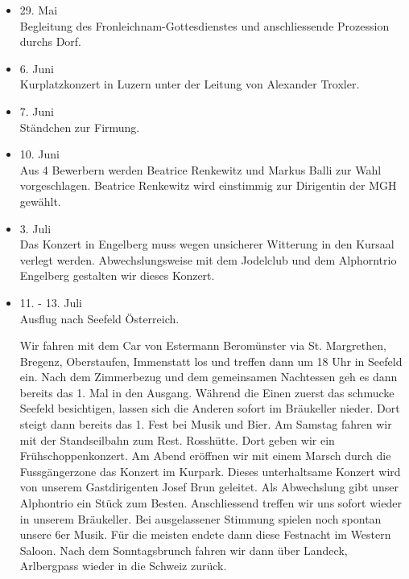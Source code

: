 \begin{history}
\begin{itemize}
        \item[]29. Mai\\
        Begleitung des Fronleichnam-Gottesdienstes und anschliessende Prozession
        durchs Dorf.

        \item[]6. Juni\\
        Kurplatzkonzert in Luzern unter der Leitung von Alexander Troxler.

        \item[]7. Juni\\
        Ständchen zur Firmung.

        \item[]10. Juni\\
        Aus 4 Bewerbern werden Beatrice Renkewitz und Markus Balli zur Wahl
        vorgeschlagen. Beatrice Renkewitz wird einstimmig zur Dirigentin der MGH
        gewählt.

        \item[]3. Juli\\
        Das Konzert in Engelberg muss wegen unsicherer Witterung in den Kursaal
        verlegt werden. Abwechslungsweise mit dem Jodelclub und dem Alphorntrio
        Engelberg gestalten wir dieses Konzert.

        \item[]11. - 13. Juli\\
        Ausflug nach Seefeld Österreich.

        Wir fahren mit dem Car von Estermann
        Beromünster via St. Margrethen, Bregenz, Oberstaufen, Immenstatt los und
        treffen dann um 18 Uhr in Seefeld ein. Nach dem Zimmerbezug und dem
        gemeinsamen Nachtessen geh es dann bereits das 1. Mal in den Ausgang.
        Während die Einen zuerst das schmucke Seefeld besichtigen, lassen sich
        die Anderen sofort im Bräukeller nieder. Dort steigt dann bereits das 1.
        Fest bei Musik und Bier. Am Samstag fahren wir mit der Standseilbahn zum
        Rest. Rosshütte. Dort geben wir ein Frühschoppenkonzert. Am Abend
        eröffnen wir mit einem Marsch durch die Fussgängerzone das Konzert im
        Kurpark. Dieses unterhaltsame Konzert wird von unserem Gastdirigenten
        Josef Brun geleitet. Als Abwechslung gibt unser Alphontrio ein Stück zum
        Besten. Anschliessend treffen wir uns sofort wieder in unserem
        Bräukeller. Bei ausgelassener Stimmung spielen noch spontan unsere 6er
        Musik. Für die meisten endete dann diese Festnacht im Western Saloon.
        Nach dem Sonntagsbrunch fahren wir dann über Landeck, Arlbergpass wieder
        in die Schweiz zurück.


\end{itemize}
\end{history}
